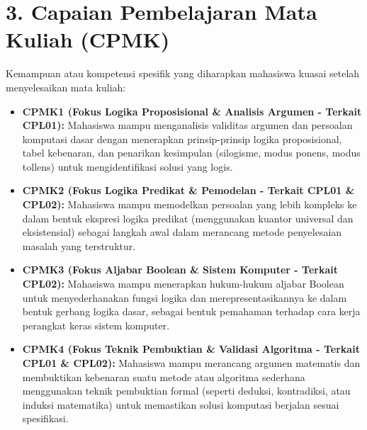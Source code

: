\documentclass[12pt,a4paper]{article}
\begin{document}
\vspace{0.5cm}

\section*{3. Capaian Pembelajaran Mata Kuliah (CPMK)}

Kemampuan atau kompetensi spesifik yang diharapkan mahasiswa kuasai setelah menyelesaikan mata kuliah:

\begin{itemize}[leftmargin=*]
  \item \textbf{CPMK1 (Fokus Logika Proposisional \& Analisis Argumen - Terkait CPL01):} Mahasiswa mampu menganalisis validitas argumen dan persoalan komputasi dasar dengan menerapkan prinsip-prinsip logika proposisional, tabel kebenaran, dan penarikan kesimpulan (silogisme, modus ponens, modus tollens) untuk mengidentifikasi solusi yang logis.
  
  \item \textbf{CPMK2 (Fokus Logika Predikat \& Pemodelan - Terkait CPL01 \& CPL02):} Mahasiswa mampu memodelkan persoalan yang lebih kompleks ke dalam bentuk ekspresi logika predikat (menggunakan kuantor universal dan eksistensial) sebagai langkah awal dalam merancang metode penyelesaian masalah yang terstruktur.
  
  \item \textbf{CPMK3 (Fokus Aljabar Boolean \& Sistem Komputer - Terkait CPL02):} Mahasiswa mampu menerapkan hukum-hukum aljabar Boolean untuk menyederhanakan fungsi logika dan merepresentasikannya ke dalam bentuk gerbang logika dasar, sebagai bentuk pemahaman terhadap cara kerja perangkat keras sistem komputer.
  
  \item \textbf{CPMK4 (Fokus Teknik Pembuktian \& Validasi Algoritma - Terkait CPL01 \& CPL02):} Mahasiswa mampu merancang argumen matematis dan membuktikan kebenaran suatu metode atau algoritma sederhana menggunakan teknik pembuktian formal (seperti deduksi, kontradiksi, atau induksi matematika) untuk memastikan solusi komputasi berjalan sesuai spesifikasi.
\end{itemize}

\vspace{0.5cm}

\end{document}
